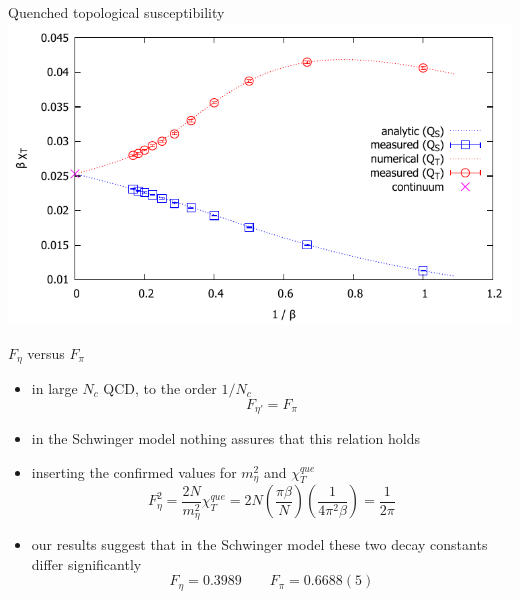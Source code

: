 \documentclass[english]{beamer}
\begin{document}
\begin{frame}{Quenched topological susceptibility}
  \includegraphics[width=1\textwidth]{figs/BeakDiagram}
\end{frame}

\begin{frame}{$F_\eta$ versus $F_\pi$}
\begin{itemize}
  \item in large $N_c$ QCD, to the order $1/N_c$
    \[
      F_{\eta'} = F_\pi
    \]
  \item in the Schwinger model nothing assures that this relation holds
  \item inserting the confirmed values for $m_\eta^2$ and $\chi_T^{que}$ 
    \[
      F_{\eta}^2 = \frac{2N}{m_\eta^2}\chi_T^{que} =
        2N \left(\frac{\pi\beta}{N}\right)
        \left(\frac{1}{4\pi^2\beta}\right) =
        \frac{1}{2\pi}
    \]
  \item our results suggest that in the Schwinger model these two decay constants differ significantly
    \[
      F_{\eta} = 0.3989 \qquad F_\pi = 0.6688(5)
    \]
\end{itemize}
\end{frame}
\end{document}
